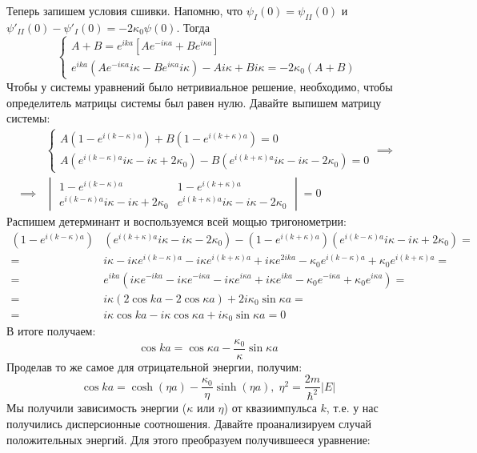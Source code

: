 Теперь запишем условия сшивки. Напомню, что $\psi_I(0) = \psi_{II}(0)$ и $\psi'_{II}(0) - \psi'_I(0) = -2\kappa_0\psi(0)$. Тогда
\[
\begin{cases}
A + B = e^{ika}\left[Ae^{-i\kappa a} + Be^{i\kappa a}\right]\\
e^{ika}(Ae^{-i\kappa a}i\kappa - Be^{i\kappa a}i\kappa) - Ai\kappa + Bi\kappa = -2\kappa_0(A+B)
\end{cases}
\]
Чтобы у системы уравнений было нетривиальное решение, необходимо, чтобы определитель матрицы системы был равен нулю. Давайте выпишем матрицу системы:
\begin{align*}
&\begin{cases}
A(1 - e^{i(k-\kappa)a}) + B(1 - e^{i(k+\kappa)a}) = 0\\
A(e^{i(k-\kappa)a}i\kappa - i\kappa + 2\kappa_0) - B(e^{i(k+\kappa)a}i\kappa - i\kappa - 2\kappa_0) = 0
\end{cases} \implies\\
\implies &\begin{vmatrix}
1 - e^{i(k-\kappa)a} & 1 - e^{i(k+\kappa)a} \\
e^{i(k-\kappa)a}i\kappa - i\kappa + 2\kappa_0 & e^{i(k+\kappa)a}i\kappa - i\kappa - 2\kappa_0
\end{vmatrix}
= 0
\end{align*}
Распишем детерминант и воспользуемся всей мощью тригонометрии:
\begin{align*}
(1 - e^{i(k-\kappa)a})&(e^{i(k+\kappa)a}i\kappa - i\kappa - 2\kappa_0) - (1 - e^{i(k+\kappa)a})(e^{i(k-\kappa)a}i\kappa - i\kappa + 2\kappa_0) = \\
 = &i\kappa - i\kappa e^{i(k-\kappa)a} - i\kappa e^{i(k+\kappa)a} + i\kappa e^{2ika} - \kappa_0 e^{i(k-\kappa)a} + \kappa_0 e^{i(k+\kappa)a} = \\
 = &e^{ika}\left( i\kappa e^{-ika} - i\kappa e^{-i\kappa a} - i\kappa e^{i\kappa a} + i\kappa e^{ika} - \kappa_0 e^{-i\kappa a} + \kappa_0 e^{i\kappa a}\right) = \\ 
 = &i\kappa\left( 2\cos ka - 2\cos\kappa a \right) + 2i\kappa_0\sin\kappa a =\\
 = &i\kappa\cos ka - i\kappa\cos\kappa a + i\kappa_0\sin\kappa a = 0
\end{align*}
В итоге получаем:
\[
\cos ka = \cos\kappa a - \frac{\kappa_0}{\kappa}\sin\kappa a
\]
Проделав то же самое для отрицательной энергии, получим:
\[
\cos ka = \cosh(\eta a) - \frac{\kappa_0}{\eta}\sinh(\eta a), \; \eta^2 = \frac{2m}{\hbar^2}|E|
\]
Мы получили зависимость энергии ($\kappa$ или $\eta$) от квазиимпульса $k$, т.е. у нас получились дисперсионные соотношения. Давайте проанализируем случай положительных энергий. Для этого преобразуем получившееся уравнение:
